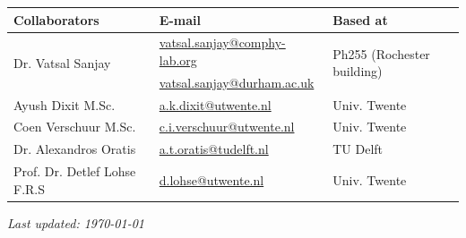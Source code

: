 \documentclass[11pt]{article}
\begin{document}
\begin{center}
\begin{tabular}{|l|l|l|}
\hline \textbf{Collaborators} & \textbf{E-mail} & \textbf{Based at} \\
\hline \multirow{2}{*}{Dr. Vatsal Sanjay} & \href{mailto:vatsal.sanjay@comphy-lab.org}{vatsal.sanjay@comphy-lab.org} & \multirow{2}{*}{Ph255 (Rochester building)} \\
& \href{mailto:vatsal.sanjay@durham.ac.uk}{vatsal.sanjay@durham.ac.uk} & \\
\hline Ayush Dixit M.Sc. & \href{mailto:a.k.dixit@utwente.nl}{a.k.dixit@utwente.nl} & Univ. Twente \\
\hline Coen Verschuur M.Sc. & \href{mailto:c.i.verschuur@utwente.nl}{c.i.verschuur@utwente.nl} & Univ. Twente \\
\hline Dr. Alexandros Oratis   & \href{mailto:a.t.oratis@tudelft.nl}{a.t.oratis@tudelft.nl}& TU Delft \\
\hline Prof. Dr. Detlef Lohse F.R.S & \href{mailto:d.lohse@utwente.nl}{d.lohse@utwente.nl} & Univ. Twente  \\
\hline
\end{tabular}
\end{center}

\vspace{1em}
\noindent\textit{Last updated: \today}

\printbibliography
\end{document}
